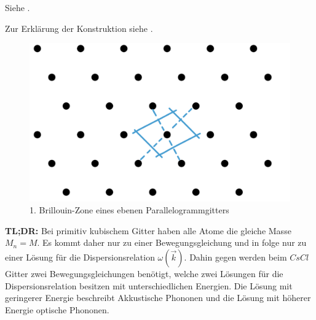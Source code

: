 \label{q:47}

Siehe .

\label{q:48}

Zur Erklärung der Konstruktion siehe .
\begin{figure}[H]
    \centering
    \begin{samepage}
        \includegraphics[width=0.4\linewidth]{resources/16-03-2012/BZ1.png}
        \caption[BZ1 Parallelogrammgitter]{1. Brillouin-Zone eines ebenen Parallelogrammgitters}
        \label{fig:BZ1_Parallelogrammgitter}
    \end{samepage}
\end{figure}

\label{q:49}

\textbf{TL;DR:} Bei primitiv kubischem Gitter haben alle Atome die gleiche Masse $M_n = M$.
Es kommt daher nur zu einer Bewegungsgleichung und in folge nur zu einer Lösung für die Dispersionsrelation $\omega(\vec{k})$.
Dahin gegen werden beim $CsCl$ Gitter zwei Bewegungsgleichungen benötigt, welche zwei Lösungen für die Dispersionsrelation besitzen mit unterschiedlichen Energien.
Die Lösung mit geringerer Energie beschreibt Akkustische Phononen und die Lösung mit höherer Energie optische Phononen.

